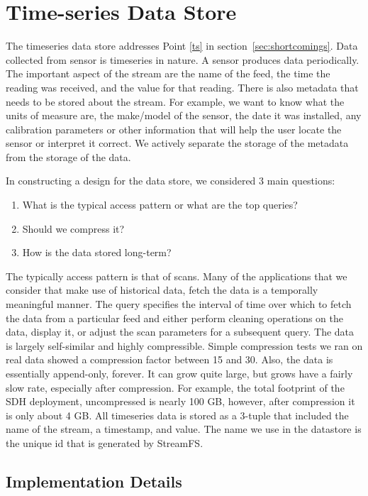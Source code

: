 \section{Time-series Data Store}

The timeseries data store addresses Point \ref{ts} in section~\ref{sec:shortcomings}.
Data collected from sensor is timeseries in nature.  A sensor produces data periodically.  The important aspect of
the stream are the name of the feed, the time the reading was received, and the value for that reading.  There is also
metadata that needs to be stored about the stream.  For example, we want to know what the units of measure are, 
the make/model of the sensor, the date it was installed, any calibration parameters or other information that will help 
the user locate the sensor or interpret it correct.  We actively separate the storage of the metadata from the storage 
of the data.

In constructing a design for the data store, we considered 3 main questions:

\begin{enumerate}
\item What is the typical access pattern or what are the top queries?
\item Should we compress it?
\item How is the data stored long-term?
\end{enumerate}

The typically access pattern is that of scans.  Many of the applications that we consider that make use of historical data, fetch the data
is a temporally meaningful manner.  The query specifies the interval of time over which to fetch the data from a particular feed
and either perform cleaning operations on the data, display it, or adjust the scan parameters for a subsequent query.
The data is largely self-similar and highly compressible.  Simple compression tests we ran on real data showed a compression factor 
between 15 and 30.  Also, the data is essentially append-only, forever.  It can grow quite large, but grows have a fairly 
slow rate, especially after compression.  For example, the total footprint of the SDH deployment, uncompressed 
is nearly 100 GB, however, after compression it is only about 4 GB.
All timeseries data is stored as a 3-tuple that included the name of the stream, a timestamp, and value.  The name we use in
the datastore is the unique id that is generated by StreamFS.  %

\subsection{Implementation Details}

